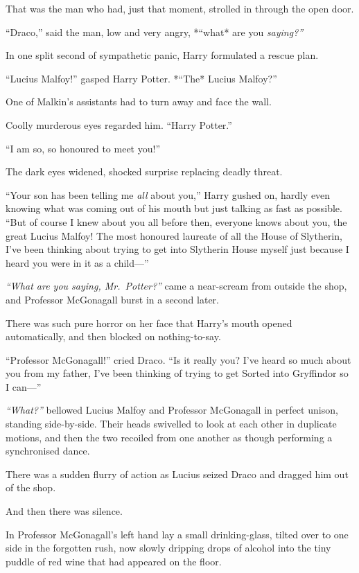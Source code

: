 That was the man who had, just that moment, strolled in through the open
door.

``Draco,'' said the man, low and very angry, *``what* are you
\emph{saying?''}

In one split second of sympathetic panic, Harry formulated a rescue
plan.

``Lucius Malfoy!'' gasped Harry Potter. *``The* Lucius Malfoy?''

One of Malkin's assistants had to turn away and face the wall.

Coolly murderous eyes regarded him. ``Harry Potter.''

``I am so, so honoured to meet you!''

The dark eyes widened, shocked surprise replacing deadly threat.

``Your son has been telling me \emph{all} about you,'' Harry gushed on,
hardly even knowing what was coming out of his mouth but just talking as
fast as possible. ``But of course I knew about you all before then,
everyone knows about you, the great Lucius Malfoy! The most honoured
laureate of all the House of Slytherin, I've been thinking about trying
to get into Slytherin House myself just because I heard you were in it
as a child---''

\emph{``What are you saying, Mr.~Potter?''} came a near-scream from
outside the shop, and Professor McGonagall burst in a second later.

There was such pure horror on her face that Harry's mouth opened
automatically, and then blocked on nothing-to-say.

``Professor McGonagall!'' cried Draco. ``Is it really you? I've heard so
much about you from my father, I've been thinking of trying to get
Sorted into Gryffindor so I can---''

\emph{``What?''} bellowed Lucius Malfoy and Professor McGonagall in
perfect unison, standing side-by-side. Their heads swivelled to look at
each other in duplicate motions, and then the two recoiled from one
another as though performing a synchronised dance.

There was a sudden flurry of action as Lucius seized Draco and dragged
him out of the shop.

And then there was silence.

In Professor McGonagall's left hand lay a small drinking-glass, tilted
over to one side in the forgotten rush, now slowly dripping drops of
alcohol into the tiny puddle of red wine that had appeared on the floor.

